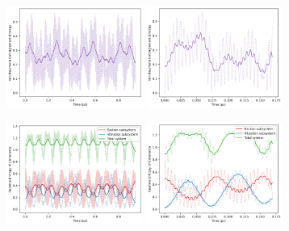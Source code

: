 \documentclass[11pt]{article}
\begin{document}
\begin{figure}[H]
    \begin{subfigure}{\textwidth}
        \centering
        \includegraphics[width=0.49\textwidth]{Research Project/Code/results/ExVib/Closed/Envelope/vne_eg.png}
        \hfill
        \includegraphics[width=0.49\textwidth]{Research Project/Code/results/ExVib/Closed/Fast/vne_eg.png}
        \caption{}
        \label{fig:EVM_CQS_ent_eg}
    \end{subfigure}

    \vspace{0.8em}

    \begin{subfigure}{\textwidth}
        \centering
        \includegraphics[width=0.49\textwidth]{Research Project/Code/results/ExVib/Closed/Envelope/coh_eg.png}
        \hfill
        \includegraphics[width=0.49\textwidth]{Research Project/Code/results/ExVib/Closed/Fast/coh_eg.png}
        \caption{}
        \label{fig:EVM_CQS_coh_eg}
    \end{subfigure}


\end{figure}
\end{document}
